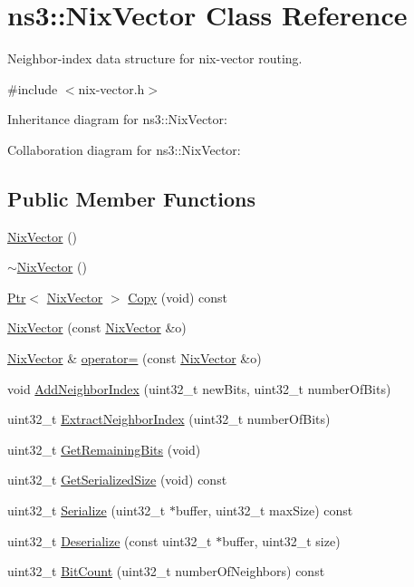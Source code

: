\hypertarget{classns3_1_1NixVector}{}\section{ns3\+:\+:Nix\+Vector Class Reference}
\label{classns3_1_1NixVector}


Neighbor-\/index data structure for nix-\/vector routing.  




{\ttfamily \#include $<$nix-\/vector.\+h$>$}



Inheritance diagram for ns3\+:\+:Nix\+Vector\+:


Collaboration diagram for ns3\+:\+:Nix\+Vector\+:
\subsection*{Public Member Functions}
\begin{DoxyCompactItemize}
\item 
\hyperlink{classns3_1_1NixVector_a69516ff47494994e74de10cc406c21d4}{Nix\+Vector} ()
\item 
\hyperlink{classns3_1_1NixVector_a54fd8cc0ac78ff34d6f4f9ec9f1e8dc2}{$\sim$\+Nix\+Vector} ()
\item 
\hyperlink{classns3_1_1Ptr}{Ptr}$<$ \hyperlink{classns3_1_1NixVector}{Nix\+Vector} $>$ \hyperlink{classns3_1_1NixVector_a7caa871baeebec7fefdec243f2b5038a}{Copy} (void) const 
\item 
\hyperlink{classns3_1_1NixVector_af8c069fedefee3f5987ae93ae40a5312}{Nix\+Vector} (const \hyperlink{classns3_1_1NixVector}{Nix\+Vector} \&o)
\item 
\hyperlink{classns3_1_1NixVector}{Nix\+Vector} \& \hyperlink{classns3_1_1NixVector_a75d6b3feb74dfc0b42c4a6da90589ee7}{operator=} (const \hyperlink{classns3_1_1NixVector}{Nix\+Vector} \&o)
\item 
void \hyperlink{classns3_1_1NixVector_a04e4e8bdfa043b0d4b6143c324cbae60}{Add\+Neighbor\+Index} (uint32\+\_\+t new\+Bits, uint32\+\_\+t number\+Of\+Bits)
\item 
uint32\+\_\+t \hyperlink{classns3_1_1NixVector_a8c6e9df500cc81701211c56786b7ecaa}{Extract\+Neighbor\+Index} (uint32\+\_\+t number\+Of\+Bits)
\item 
uint32\+\_\+t \hyperlink{classns3_1_1NixVector_a18b56f50ce3c1df76c08f3226bbe3502}{Get\+Remaining\+Bits} (void)
\item 
uint32\+\_\+t \hyperlink{classns3_1_1NixVector_aa5f0129704510e61dce07d10ac5b48aa}{Get\+Serialized\+Size} (void) const 
\item 
uint32\+\_\+t \hyperlink{classns3_1_1NixVector_ad3f2ce4518e3db62357e6295d49c1e90}{Serialize} (uint32\+\_\+t $\ast$buffer, uint32\+\_\+t max\+Size) const 
\item 
uint32\+\_\+t \hyperlink{classns3_1_1NixVector_aaca7360c5f8d3af2ea8a64c203878b09}{Deserialize} (const uint32\+\_\+t $\ast$buffer, uint32\+\_\+t size)
\item 
uint32\+\_\+t \hyperlink{classns3_1_1NixVector_a2110776224e52b8fe4220b1e51b946a6}{Bit\+Count} (uint32\+\_\+t number\+Of\+Neighbors) const 
\end{DoxyCompactItemize}

